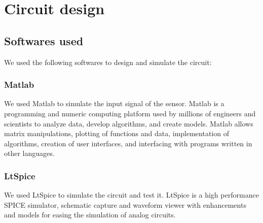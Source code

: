 \section{Circuit design} \label{section: circuit design}
\subsection{Softwares used}
We used the following softwares to design and simulate the circuit:
\subsubsection{Matlab}
We used Matlab to simulate the input signal of the sensor. Matlab is a programming and numeric computing platform used by millions of engineers and scientists to analyze data, develop algorithms, and create models. Matlab allows matrix manipulations, plotting of functions and data, implementation of algorithms, creation of user interfaces, and interfacing with programs written in other languages.
\subsubsection{LtSpice}
We used LtSpice to simulate the circuit and test it. LtSpice is a high performance SPICE simulator, schematic capture and waveform viewer with enhancements and models for easing the simulation of analog circuits.

